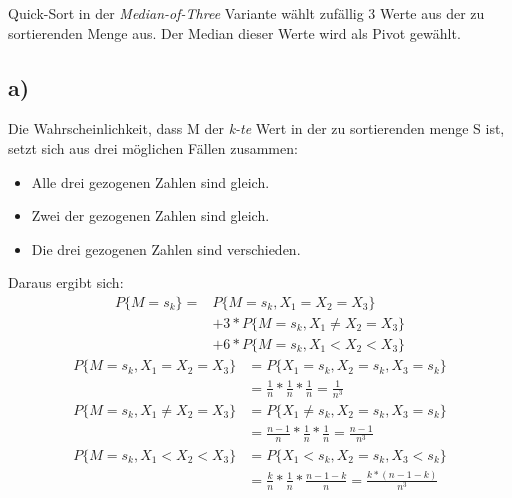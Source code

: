 \documentclass[11pt,a4paper]{article}
\begin{document}
    Quick-Sort in der \textit{Median-of-Three} Variante wählt zufällig 3 Werte aus der zu sortierenden Menge aus. Der Median dieser Werte wird als Pivot gewählt.\\

    \subsection*{a)}

      Die Wahrscheinlichkeit, dass M der \textit{k-te} Wert in der zu sortierenden menge S ist, setzt sich aus drei möglichen Fällen zusammen:
      \begin{itemize}
      	\item Alle drei gezogenen Zahlen sind gleich.
      	\item Zwei der gezogenen Zahlen sind gleich.
      	\item Die drei gezogenen Zahlen sind verschieden.
      \end{itemize}
      Daraus ergibt sich:
      \begin{equation} \label{eq1}
      	\begin{split}
      	  P\{ M=s_k \} = & P\{ M=s_k , X_1 =X_2 =X_3 \} \\
      	  & + 3*P\{ M=s_k , X_1 \neq X_2 = X_3 \}\\
      	  & + 6*P\{ M=s_k , X_1 < X_2 < X_3 \}
      	  \end{split}
      \end{equation}
      \begin{equation} \label{eq2}
        \begin{split}
          P\{ M=s_k , X_1 =X_2 =X_3 \} & = P\{X_1 =s_k , X_2 =s_k , X_3 =s_k \}\\
          & = \frac{1}{n} * \frac{1}{n} * \frac{1}{n} = \frac{1}{n^3}
        \end{split}
      \end{equation}
      \begin{equation} \label{eq3}
      	\begin{split}
      	  P\{ M=s_k , X_1 \neq X_2 =X_3 \} & = P\{X_1 \neq s_k , X_2 =s_k , X_3 =s_k \}\\
      	  & = \frac{n-1}{n} * \frac{1}{n} * \frac{1}{n} = \frac{n-1}{n^3}
      	\end{split}
      \end{equation}
      \begin{equation} \label{eq4}
      	\begin{split}
      	  P\{ M=s_k , X_1 < X_2 < X_3 \} & = P\{X_1 < s_k , X_2 =s_k , X_3 < s_k \}\\
      	  & = \frac{k}{n} * \frac{1}{n} * \frac{n-1-k}{n} = \frac{k*(n-1-k)}{n^3}
      	\end{split}
      \end{equation}
\end{document}
